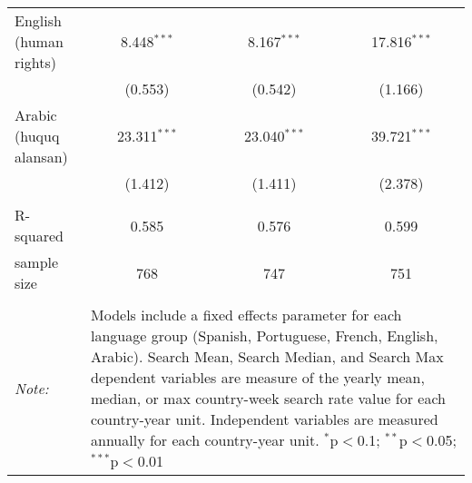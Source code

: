 \begin{table}[!htbp]
\begin{tabular}{@{\extracolsep{5pt}}lccc}
  English (human rights) & 8.448$^{***}$ & 8.167$^{***}$ & 17.816$^{***}$ \\ 
  & (0.553) & (0.542) & (1.166) \\ 
  Arabic (huquq alansan) & 23.311$^{***}$ & 23.040$^{***}$ & 39.721$^{***}$ \\ 
  & (1.412) & (1.411) & (2.378) \\ 
 \hline \\[-1.8ex] 
R-squared  & 0.585 & 0.576 & 0.599 \\ 
sample size  & 768 & 747 & 751 \\ 
\hline 
\hline \\[-1.8ex] 
\textit{Note:}  & \multicolumn{3}{l}{\parbox[t]{8cm}{Models include a fixed effects parameter for each language group (Spanish, Portuguese, French, English, Arabic). Search Mean, Search Median, and Search Max dependent variables are measure of the yearly mean, median, or max country-week search rate value for each country-year unit. Independent variables are measured annually for each country-year unit. $^{*}$p$<$0.1; $^{**}$p$<$0.05; $^{***}$p$<$0.01}} \\ 
\end{tabular} 
\end{table} 
